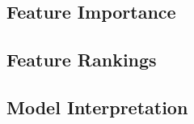 \subsection{Feature Importance}
\label{sec:feature_importance}



\subsection{Feature Rankings}
\label{sec:feature_rankings}



\subsection{Model Interpretation}
\label{sec:model_interpretation}

